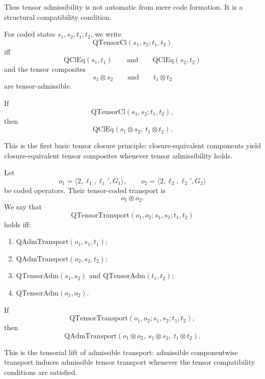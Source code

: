 \begin{remark}
Thus tensor admissibility is not automatic from mere code formation. It is a structural compatibility condition.
\end{remark}

\begin{definition}
For coded states $s_1,s_2,t_1,t_2$, we write
\[
\mathrm{QTensorCl}(s_1,s_2;t_1,t_2)
\]
iff
\[
\mathrm{QClEq}(s_1,t_1)
\qquad\text{and}\qquad
\mathrm{QClEq}(s_2,t_2)
\]
and the tensor composites
\[
s_1\otimes s_2
\qquad\text{and}\qquad
t_1\otimes t_2
\]
are tensor-admissible.
\end{definition}

\begin{axiom}
If
\[
\mathrm{QTensorCl}(s_1,s_2;t_1,t_2),
\]
then
\[
\mathrm{QClEq}(s_1\otimes s_2,\ t_1\otimes t_2).
\]
\end{axiom}

\begin{remark}
This is the first basic tensor closure principle: closure-equivalent components yield closure-equivalent tensor composites whenever tensor admissibility holds.
\end{remark}

\begin{definition}
Let
\[
o_1=\langle 2,\ell_1,\ell_1',G_1\rangle,
\qquad
o_2=\langle 2,\ell_2,\ell_2',G_2\rangle
\]
be coded operators. Their tensor-coded transport is
\[
o_1\otimes o_2.
\]
We say that
\[
\mathrm{QTensorTransport}(o_1,o_2;s_1,s_2;t_1,t_2)
\]
holds iff:
\begin{enumerate}
\item $\mathrm{QAdmTransport}(o_1,s_1,t_1)$;
\item $\mathrm{QAdmTransport}(o_2,s_2,t_2)$;
\item $\mathrm{QTensorAdm}(s_1,s_2)$ and $\mathrm{QTensorAdm}(t_1,t_2)$;
\item $\mathrm{QTensorAdm}(o_1,o_2)$.
\end{enumerate}
\end{definition}

\begin{axiom}
If
\[
\mathrm{QTensorTransport}(o_1,o_2;s_1,s_2;t_1,t_2),
\]
then
\[
\mathrm{QAdmTransport}(o_1\otimes o_2,\ s_1\otimes s_2,\ t_1\otimes t_2).
\]
\end{axiom}

\begin{remark}
This is the tensorial lift of admissible transport: admissible componentwise transport induces admissible tensor transport whenever the tensor compatibility conditions are satisfied.
\end{remark}

